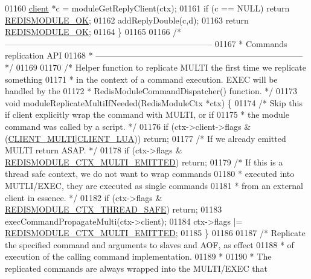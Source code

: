 \begin{DoxyCode}
{{{01160     \hyperlink{structclient}{client} *c = moduleGetReplyClient(ctx);
01161     \textcolor{keywordflow}{if} (c == NULL) \textcolor{keywordflow}{return} \hyperlink{redismodule_8h_a1bc5bfd69abcd378ff52c640adc5418d}{REDISMODULE\_OK};
01162     addReplyDouble(c,d);
01163     \textcolor{keywordflow}{return} \hyperlink{redismodule_8h_a1bc5bfd69abcd378ff52c640adc5418d}{REDISMODULE\_OK};
01164 \}
01165 
01166 \textcolor{comment}{/* --------------------------------------------------------------------------}
01167 \textcolor{comment}{ * Commands replication API}
01168 \textcolor{comment}{ * -------------------------------------------------------------------------- */}
01169 
01170 \textcolor{comment}{/* Helper function to replicate MULTI the first time we replicate something}
01171 \textcolor{comment}{ * in the context of a command execution. EXEC will be handled by the}
01172 \textcolor{comment}{ * RedisModuleCommandDispatcher() function. */}
01173 \textcolor{keywordtype}{void} moduleReplicateMultiIfNeeded(RedisModuleCtx *ctx) \{
01174     \textcolor{comment}{/* Skip this if client explicitly wrap the command with MULTI, or if}
01175 \textcolor{comment}{     * the module command was called by a script. */}
01176     \textcolor{keywordflow}{if} (ctx->client->flags & (\hyperlink{server_8h_a7f61f783f429419f8c593291a509b03a}{CLIENT\_MULTI}|\hyperlink{server_8h_af9d0b0f45ef2c1fd29ac714a300de706}{CLIENT\_LUA})) \textcolor{keywordflow}{return};
01177     \textcolor{comment}{/* If we already emitted MULTI return ASAP. */}
01178     \textcolor{keywordflow}{if} (ctx->flags & \hyperlink{module_8c_a4b2299e0b7b9fda08895270574120015}{REDISMODULE\_CTX\_MULTI\_EMITTED}) \textcolor{keywordflow}{return};
01179     \textcolor{comment}{/* If this is a thread safe context, we do not want to wrap commands}
01180 \textcolor{comment}{     * executed into MUTLI/EXEC, they are executed as single commands}
01181 \textcolor{comment}{     * from an external client in essence. */}
01182     \textcolor{keywordflow}{if} (ctx->flags & \hyperlink{module_8c_a884fbd2b3a1b008f1635afaeb87ca52a}{REDISMODULE\_CTX\_THREAD\_SAFE}) \textcolor{keywordflow}{return};
01183     execCommandPropagateMulti(ctx->client);
01184     ctx->flags |= \hyperlink{module_8c_a4b2299e0b7b9fda08895270574120015}{REDISMODULE\_CTX\_MULTI\_EMITTED};
01185 \}
01186 
01187 \textcolor{comment}{/* Replicate the specified command and arguments to slaves and AOF, as effect}
01188 \textcolor{comment}{ * of execution of the calling command implementation.}
01189 \textcolor{comment}{ *}
01190 \textcolor{comment}{ * The replicated commands are always wrapped into the MULTI/EXEC that}
}}}
\end{DoxyCode}
